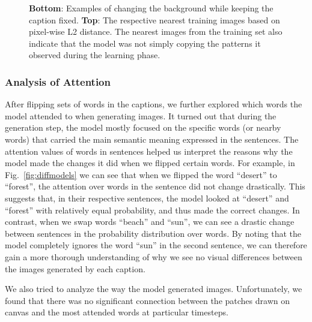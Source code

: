 \documentclass{article} %
\newcommand{\Figref}[1]{Fig.~\ref{#1}}
\begin{document}
\begin{figure}[!t]
\begin{center}
%
\quad
%
\end{center}
\caption{\textbf{Bottom}: Examples of changing the background while keeping the caption fixed. \textbf{Top}: The respective nearest training images based on pixel-wise L2 distance. The nearest images from the training set also indicate that the model was not simply copying the patterns it observed during the learning phase.}
\label{fig:genimages2}
\end{figure}

\subsubsection{Analysis of Attention}
After flipping sets of words in the captions, we further explored which words the model attended to when generating images. It turned out that during the generation step, the model mostly focused on the specific words (or nearby words) that carried the main semantic meaning expressed in the sentences. The attention values of words in sentences helped us interpret the reasons why the model made the changes it did when we flipped certain words. For example, in \Figref{fig:diffmodels} we can see that when we flipped the word ``desert'' to ``forest'', the attention over words in the sentence did not change drastically. This suggests that, in their respective sentences, the model looked at ``desert'' and ``forest'' with relatively equal probability, and thus made the correct changes. In contrast, when we swap words ``beach'' and ``sun'', we can see a drastic change between sentences in the probability distribution over words. By noting that the model completely ignores the word ``sun'' in the second sentence, we can therefore gain a more thorough understanding of why we see no visual differences between the images generated by each caption.

We also tried to analyze the way the model generated images. Unfortunately, we found that there was no significant connection between the patches drawn on canvas and the most attended words at particular timesteps.
\end{document}
